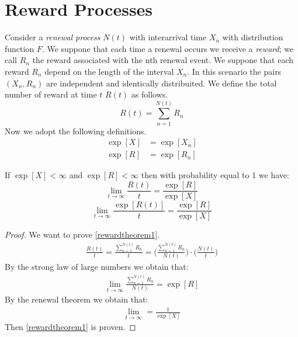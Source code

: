 \section{Reward Processes}

Consider a \textit{renewal process} $N(t)$ with interarrival time $X_n$ with distribution function $F$. We suppone that each time a renewal occurs we receive a \textit{reward}; we call $R_n$ the reward associated with the nth renewal event. We suppone that each reward $R_n$ depend on the length of the interval $X_n$. In this scenario the pairs $(X_n, R_n)$ are independent and identically distribuited. We define the total number of reward at time $t$ $R(t)$ as follows.
\begin{equation}
	R(t)=\sum_{n=1}^{N(t)}R_n
\end{equation}
Now we adopt the following definitions.
\begin{align*}
	\exp[X] & =\exp[X_n]
	\\ \exp[R] & =\exp[R_n]
\end{align*}
\begin{theorem}[Th. 3.6 (Ross)]
  If $\exp[X]<\infty$ and $\exp[R]<\infty$ then with probability equal to 1 we have:
	\begin{equation}
		\lim_{t \to \infty}\frac{R(t)}{t}=\frac{\exp[R]}{\exp[X]}
		\label{rewardtheorem1}
	\end{equation}
	\begin{equation}
		\lim_{t \to \infty}\frac{\exp[R(t)]}{t}=\frac{\exp[R]}{\exp[X]}
		\label{rewardtheorem2}
	\end{equation}
\end{theorem}
\begin{proof}
	We want to prove \ref{rewardtheorem1}.
	\begin{align*}
		\frac{R(t)}{t}=\frac{\sum_{n=1}^{N(t)}R_n}{t}= \bigg( \frac{\sum_{n=1}^{N(t)}R_n}{N(t)}\bigg)\cdot\bigg(\frac{N(t)}{t}\bigg)
	\end{align*}
	By the strong law of large numbers we obtain that:
	\begin{align*}
		\lim_{t \to \infty}\frac{\sum_{n=1}^{N(t)}R_n}{N(t)}=\exp[R]
	\end{align*}
	By the renewal theorem we obtain that:
	\begin{align*}
		\lim_{t \to \infty}=\frac{1}{\exp[X]}
	\end{align*}
	Then \ref{rewardtheorem1} is proven.
\end{proof}
